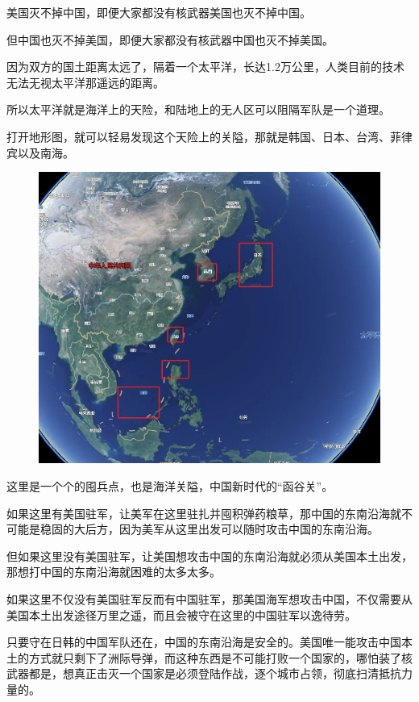 \documentclass[UTF8, 11pt, oneside]{ctexart}
\begin{document}
美国灭不掉中国，即便大家都没有核武器美国也灭不掉中国。

但中国也灭不掉美国，即便大家都没有核武器中国也灭不掉美国。

因为双方的国土距离太远了，隔着一个太平洋，长达1.2万公里，人类目前的技术无法无视太平洋那遥远的距离。

所以太平洋就是海洋上的天险，和陆地上的无人区可以阻隔军队是一个道理。

打开地形图，就可以轻易发现这个天险上的关隘，那就是韩国、日本、台湾、菲律宾以及南海。

\begin{figure}[H]
    \centering
    \includegraphics[width=13cm]{2024-08-19-011.jpg}
\end{figure}

这里是一个个的囤兵点，也是海洋关隘，中国新时代的“函谷关”。

如果这里有美国驻军，让美军在这里驻扎并囤积弹药粮草，那中国的东南沿海就不可能是稳固的大后方，因为美军从这里出发可以随时攻击中国的东南沿海。

但如果这里没有美国驻军，让美国想攻击中国的东南沿海就必须从美国本土出发，那想打中国的东南沿海就困难的太多太多。

如果这里不仅没有美国驻军反而有中国驻军，那美国海军想攻击中国，不仅需要从美国本土出发途径万里之遥，而且会被守在这里的中国驻军以逸待劳。

只要守在日韩的中国军队还在，中国的东南沿海是安全的。美国唯一能攻击中国本土的方式就只剩下了洲际导弹，而这种东西是不可能打败一个国家的，哪怕装了核武器都是，想真正击灭一个国家是必须登陆作战，逐个城市占领，彻底扫清抵抗力量的。
\end{document}
